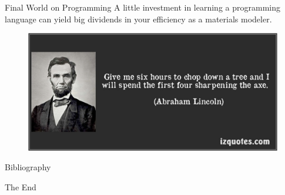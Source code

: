 \documentclass[aspectratio=169]{beamer}
\begin{document}
\begin{frame}{Final World on Programming}
A little investment in learning a programming language can yield big dividends in your efficiency as a materials modeler.
\begin{figure}
    \centering
    \includegraphics[width=0.7\linewidth]{lectures/figures/9_lincoln.png}
\end{figure} 
\end{frame} 

    \begin{frame}[allowframebreaks]{Bibliography}
        
        
    \end{frame}



    \begin{frame}
        \Huge{\centerline{The End}}
    \end{frame}
\end{document}

